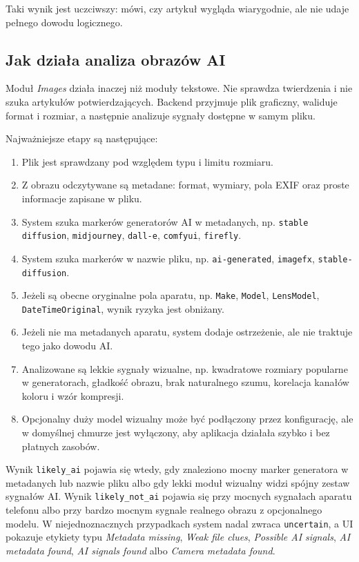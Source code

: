 \documentclass[12pt,a4paper]{article}
\begin{document}
Taki wynik jest uczciwszy: mówi, czy artykuł wygląda wiarygodnie, ale nie udaje pełnego dowodu logicznego.

\subsection{Jak działa analiza obrazów AI}
Moduł \textit{Images} działa inaczej niż moduły tekstowe.
Nie sprawdza twierdzenia i nie szuka artykułów potwierdzających.
Backend przyjmuje plik graficzny, waliduje format i rozmiar, a następnie analizuje sygnały dostępne w samym pliku.

Najważniejsze etapy są następujące:
\begin{enumerate}
  \item Plik jest sprawdzany pod względem typu i limitu rozmiaru.
  \item Z obrazu odczytywane są metadane: format, wymiary, pola EXIF oraz proste informacje zapisane w pliku.
  \item System szuka markerów generatorów AI w metadanych, np. \texttt{stable diffusion}, \texttt{midjourney}, \texttt{dall-e}, \texttt{comfyui}, \texttt{firefly}.
  \item System szuka markerów w nazwie pliku, np. \texttt{ai-generated}, \texttt{imagefx}, \texttt{stable-diffusion}.
  \item Jeżeli są obecne oryginalne pola aparatu, np. \texttt{Make}, \texttt{Model}, \texttt{LensModel}, \texttt{DateTimeOriginal}, wynik ryzyka jest obniżany.
  \item Jeżeli nie ma metadanych aparatu, system dodaje ostrzeżenie, ale nie traktuje tego jako dowodu AI.
  \item Analizowane są lekkie sygnały wizualne, np. kwadratowe rozmiary popularne w generatorach, gładkość obrazu, brak naturalnego szumu, korelacja kanałów koloru i wzór kompresji.
  \item Opcjonalny duży model wizualny może być podłączony przez konfigurację, ale w domyślnej chmurze jest wyłączony, aby aplikacja działała szybko i bez płatnych zasobów.
\end{enumerate}

Wynik \texttt{likely\_ai} pojawia się wtedy, gdy znaleziono mocny marker generatora w metadanych lub nazwie pliku albo gdy lekki moduł wizualny widzi spójny zestaw sygnałów AI.
Wynik \texttt{likely\_not\_ai} pojawia się przy mocnych sygnałach aparatu telefonu albo przy bardzo mocnym sygnale realnego obrazu z opcjonalnego modelu.
W niejednoznacznych przypadkach system nadal zwraca \texttt{uncertain}, a UI pokazuje etykiety typu \textit{Metadata missing}, \textit{Weak file clues}, \textit{Possible AI signals}, \textit{AI metadata found}, \textit{AI signals found} albo \textit{Camera metadata found}.
\end{document}
